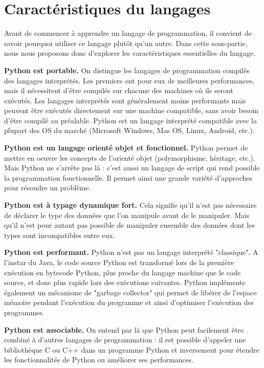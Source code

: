 \documentclass[12pt, a4paper]{article}
\begin{document}
\section{Caractéristiques du langages}
Avant de commencer à apprendre un langage de programmation, il convient de savoir pourquoi utiliser ce langage plutôt qu'un autre. Dans cette sous-partie, nous nous proposons donc d'explorer les caractéristiques essentielles du langage.

\textbf{Python est portable.} On distingue les langages de programmation compilés des langages interprétés. Les premiers ont pour eux de meilleures performances, mais il nécessitent d'être compilés sur chacune des machines où ils seront exécutés. Les langages interprétés sont généralement moins performants mais peuvent être exécutés directement sur une machine compatible, sans avoir besoin d'être compilé au préalable. Python est un langage interprété compatible avec la plupart des OS du marché (Microsoft Windows, Mas OS, Linux, Android, etc.).

\textbf{Python est un langage orienté objet et fonctionnel.} Python permet de mettre en oeuvre les concepts de l'orienté objet (polymorphisme, héritage, etc.). Mais Python ne s'arrête pas là : c'est aussi un langage de script qui rend possible la programmation fonctionnelle. Il permet ainsi une grande variété d'approches pour résoudre un problème.

\textbf{Python est à typage dynamique fort.} Cela signifie qu'il n'est pas nécessaire de déclarer le type des données que l'on manipule avant de le manipuler. Mais qu'il n'est pour autant pas possible de manipuler ensemble des données dont les types sont incompatibles entre eux.

\textbf{Python est performant.} Python n'est pas un langage interprété "classique". A l'instar du Java, le code source Python est transformé lors de la première exécution en bytecode Python, plus proche du langage machine que le code source, et donc plus rapide lors des exécutions suivantes. Python implémente également un mécanisme de "garbage collector" qui permet de libérer de l'espace mémoire pendant l'exécution du programme et ainsi d'optimiser l'exécution des programmes.

\textbf{Python est associable.} On entend par là que Python peut facilement être combiné à d'autres langages de programmation : il est possible d'appeler une bibliothèque C ou C++ dans un programme Python et inversement pour étendre les fonctionnalités de Python ou améliorer ses performances.
\end{document}
